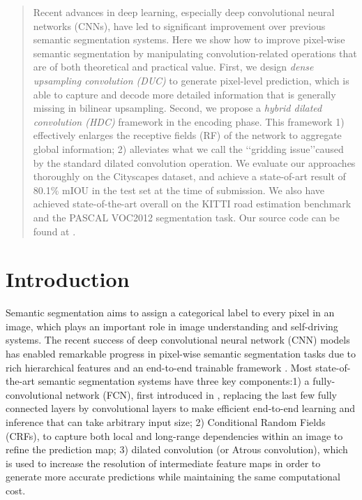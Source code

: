 \documentclass[10pt,twocolumn,letterpaper]{article}
\begin{document}
\begin{abstract}
Recent advances in deep learning, especially deep convolutional neural networks (CNNs), have led to significant improvement over previous semantic segmentation systems. Here we show how to improve pixel-wise semantic segmentation by manipulating convolution-related operations that are of both theoretical and practical value. First, we design \textit{dense upsampling convolution (DUC)} to generate pixel-level prediction, which is able to capture and decode more detailed information that is generally missing in bilinear upsampling. Second, we propose a \textit{hybrid dilated convolution (HDC)} framework in the encoding phase. This framework 1) effectively enlarges the receptive fields (RF) of the network to aggregate global information; 2) alleviates what we call the \lq\lq gridding issue\rq\rq caused by the standard dilated convolution operation. We evaluate our approaches thoroughly on the Cityscapes dataset, and achieve a state-of-art result of 80.1\% mIOU in the test set at the time of submission. We also have achieved state-of-the-art overall on the KITTI road estimation benchmark and the PASCAL VOC2012 segmentation task. Our source code can be found at \href{https://github.com/TuSimple/TuSimple-DUC}{} .
\end{abstract}

\section{Introduction}

Semantic segmentation aims to assign a categorical label to every pixel in an image, which plays an important role in image understanding and self-driving systems. The recent success of deep convolutional neural network (CNN) models \cite{krizhevsky2012imagenet,simonyan2014very,he2015deep} has enabled remarkable progress in pixel-wise semantic segmentation tasks due to rich hierarchical features and an end-to-end trainable framework \cite{long2015fully,zheng2015conditional,yu2015multi,liu2015semantic,lin2015efficient,chen2016deeplab}. Most state-of-the-art semantic segmentation systems have three key components:1) a fully-convolutional network (FCN), first introduced in \cite{long2015fully}, replacing the last few fully connected layers by convolutional layers to make efficient end-to-end learning and inference that can take arbitrary input size; 2) Conditional Random Fields (CRFs), to capture both local and long-range dependencies within an image to refine the prediction map; 3) dilated convolution (or Atrous convolution), which is used to increase the resolution of intermediate feature maps in order to generate more accurate predictions while maintaining the same computational cost.
\end{document}
